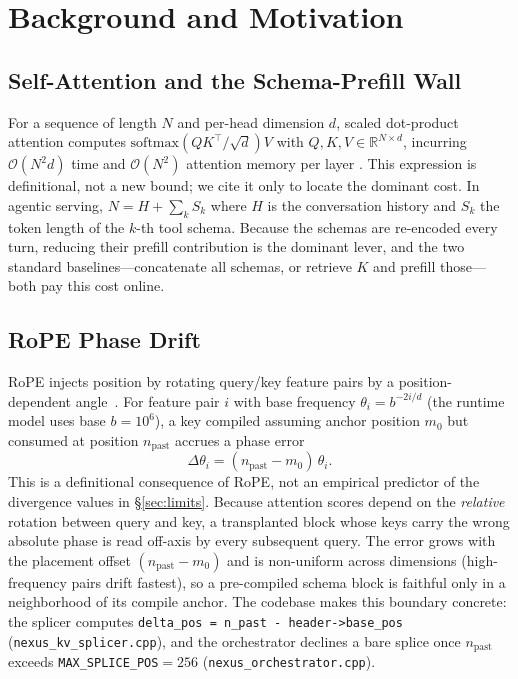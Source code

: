 \documentclass[10pt,conference]{IEEEtran}
\newcommand{\code}[1]{\texttt{\small #1}}
\begin{document}
\section{Background and Motivation}
\subsection{Self-Attention and the Schema-Prefill Wall}
For a sequence of length $N$ and per-head dimension $d$, scaled dot-product attention
computes $\mathrm{softmax}(QK^\top/\sqrt{d})V$ with $Q,K,V\in\mathbb{R}^{N\times d}$,
incurring $\mathcal{O}(N^2 d)$ time and $\mathcal{O}(N^2)$ attention memory per layer
\cite{vaswani2017attention}. This expression is definitional, not a new bound; we cite it
only to locate the dominant cost. In agentic serving, $N=H+\sum_{k}S_k$ where $H$ is the
conversation history and $S_k$ the token length of the $k$-th tool schema. Because the
schemas are re-encoded every turn, reducing their prefill contribution is the dominant lever,
and the two standard baselines---concatenate all schemas, or retrieve $K$ and prefill
those---both pay this cost online.

\subsection{RoPE Phase Drift}
\label{sec:rope}
RoPE injects position by rotating query/key feature pairs by a position-dependent
angle~\cite{su2024roformer}. For feature pair $i$ with base frequency $\theta_i=b^{-2i/d}$
(the runtime model uses base $b=10^6$), a key compiled assuming anchor position $m_0$ but
consumed at position $n_{\mathrm{past}}$ accrues a phase error
\begin{equation}
\Delta\theta_i = (n_{\mathrm{past}}-m_0)\,\theta_i .
\label{eq:drift}
\end{equation}
This is a definitional consequence of RoPE, not an empirical predictor of the divergence
values in \S\ref{sec:limits}. Because attention scores depend on the \emph{relative} rotation
between query and key, a transplanted block whose keys carry the wrong absolute phase is read
off-axis by every subsequent query. The error grows with the placement offset
$(n_{\mathrm{past}}-m_0)$ and is non-uniform across dimensions (high-frequency pairs drift
fastest), so a pre-compiled schema block is faithful only in a neighborhood of its compile
anchor. The codebase makes this boundary concrete: the splicer computes
\code{delta\_pos = n\_past - header->base\_pos} (\code{nexus\_kv\_splicer.cpp}), and the
orchestrator declines a bare splice once $n_{\mathrm{past}}$ exceeds
\code{MAX\_SPLICE\_POS}${}=256$ (\code{nexus\_orchestrator.cpp}).
\end{document}
